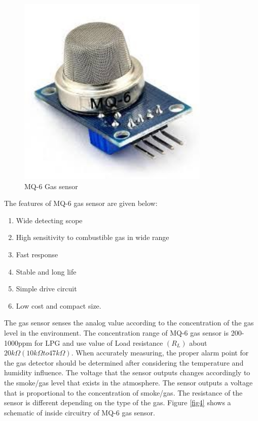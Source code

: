 \begin{figure}[h]
  \centering
  \includegraphics[width=3.6in]{3}
  \caption{MQ-6 Gas sensor}\label{fig3}
\end{figure}

The features of MQ-6 gas sensor are given below:

\begin{enumerate}
  \item Wide detecting scope
\item High sensitivity to combustible gas in wide range
\item Fast response
\item Stable and long life
\item Simple drive circuit
\item Low cost and compact size.
\end{enumerate}

The gas sensor senses the analog value according to the concentration of the gas level in the environment. The concentration range of MQ-6 gas sensor is 200-1000ppm for LPG and use value of Load resistance $(R_L)$ about $20 k\Omega (10 k\Omega to 47 k\Omega)$. When accurately measuring, the proper alarm point for the gas detector should be determined after considering the temperature and humidity influence. The voltage that the sensor outputs changes accordingly to the smoke/gas level that exists in the atmosphere. The sensor outputs a voltage that is proportional to the concentration of smoke/gas. The resistance of the sensor is different depending on the type of the gas. Figure \ref{fig4} shows a schematic of inside circuitry of MQ-6 gas sensor.


